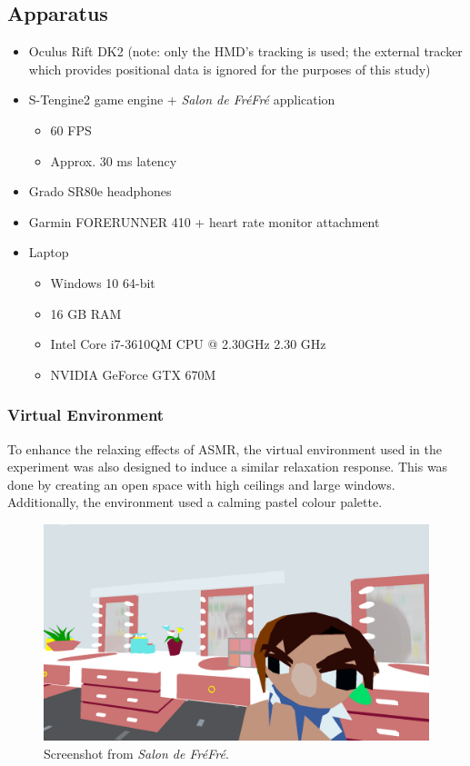 \documentclass{sigchi}
\begin{document}
\subsection{Apparatus}
\begin{itemize}
\item{Oculus Rift DK2 (note: only the HMD's tracking is used; the external tracker which provides positional data is ignored for the purposes of this study)}
\item{S-Tengine2 game engine + \textit{Salon de Fr\'{e}Fr\'{e}} application
\begin{itemize}
\item{60 FPS}
\item{Approx. 30 ms latency}
\end{itemize}
}
\item{Grado SR80e headphones}
\item{Garmin FORERUNNER 410 + heart rate monitor attachment}
\item{Laptop
\begin{itemize}
\item{Windows 10 64-bit}
\item{16 GB RAM}
\item{Intel Core i7-3610QM CPU @ 2.30GHz 2.30 GHz}
\item{NVIDIA GeForce GTX 670M}
\end{itemize}
}
\end{itemize}
\subsubsection{Virtual Environment}
To enhance the relaxing effects of ASMR, the virtual environment used in the experiment was also designed to induce a similar relaxation response. This was done by creating an open space with high ceilings and large windows. Additionally, the environment used a calming pastel colour palette. 

\begin{figure}[htb]
\centering
  \includegraphics[width=0.9\columnwidth]{figures/game}
  \caption{Screenshot from \textit{Salon de Fr\'{e}Fr\'{e}}.}
  \label{fig:game}
\end{figure}
\end{document}
